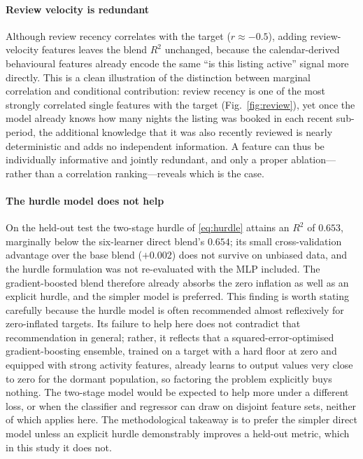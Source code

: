 \documentclass[review,12pt]{elsarticle}
\begin{document}
\paragraph{Review velocity is redundant}
Although review recency correlates with the target ($r\approx-0.5$), adding
review-velocity features leaves the blend $R^2$ unchanged, because the
calendar-derived behavioural features already encode the same ``is this listing
active'' signal more directly. This is a clean illustration of the distinction
between marginal correlation and conditional contribution: review recency is one of
the most strongly correlated single features with the target
(Fig.~\ref{fig:review}), yet once the model already knows how many nights the
listing was booked in each recent sub-period, the additional knowledge that it was
also recently reviewed is nearly deterministic and adds no independent information.
A feature can thus be individually informative and jointly redundant, and only a
proper ablation---rather than a correlation ranking---reveals which is the case.

\paragraph{The hurdle model does not help}
On the held-out test the two-stage hurdle of \eqref{eq:hurdle} attains an $R^2$ of
$0.653$, marginally below the six-learner direct blend's $0.654$; its small
cross-validation advantage over the base blend ($+0.002$) does not survive on
unbiased data, and the hurdle formulation was not re-evaluated with the MLP
included. The gradient-boosted blend
therefore already absorbs the zero inflation as well as an explicit hurdle, and
the simpler model is preferred. This finding is worth stating carefully because the
hurdle model is often recommended almost reflexively for zero-inflated targets. Its
failure to help here does not contradict that recommendation in general; rather, it
reflects that a squared-error-optimised gradient-boosting ensemble, trained on a
target with a hard floor at zero and equipped with strong activity features, already
learns to output values very close to zero for the dormant population, so factoring
the problem explicitly buys nothing. The two-stage model would be expected to help
more under a different loss, or when the classifier and regressor can draw on
disjoint feature sets, neither of which applies here. The methodological takeaway is
to prefer the simpler direct model unless an explicit hurdle demonstrably improves a
held-out metric, which in this study it does not.
\end{document}
